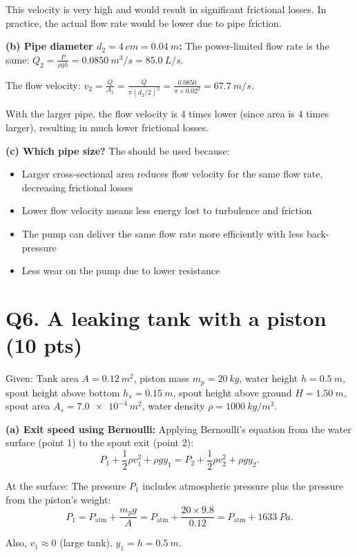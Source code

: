 \documentclass[11pt]{article}
\newcommand{\ans}[1]{\boxed{\displaystyle #1}}
\begin{document}
This velocity is very high and would result in significant frictional losses. In practice, the actual flow rate would be lower due to pipe friction.

\textbf{(b) Pipe diameter $d_2 = \SI{4}{cm} = \SI{0.04}{m}$:} The power-limited flow rate is the same: $Q_2 = \frac{P}{\rho g h} = \ans{\SI{0.0850}{m^3/s} = \SI{85.0}{L/s}}$.

The flow velocity: $v_2 = \frac{Q}{A_2} = \frac{Q}{\pi (d_2/2)^2} = \frac{0.0850}{\pi \times 0.02^2} = \SI{67.7}{m/s}$.

With the larger pipe, the flow velocity is 4 times lower (since area is 4 times larger), resulting in much lower frictional losses.

\textbf{(c) Which pipe size?} The \ans{4 cm pipe} should be used because:
\begin{itemize}
  \item Larger cross-sectional area reduces flow velocity for the same flow rate, decreasing frictional losses
  \item Lower flow velocity means less energy lost to turbulence and friction
  \item The pump can deliver the same flow rate more efficiently with less back-pressure
  \item Less wear on the pump due to lower resistance
\end{itemize}

\section*{Q6. A leaking tank with a piston (10 pts)}
Given: Tank area $A = \SI{0.12}{m^2}$, piston mass $m_p = \SI{20}{kg}$, water height $h = \SI{0.5}{m}$, spout height above bottom $h_s = \SI{0.15}{m}$, spout height above ground $H = \SI{1.50}{m}$, spout area $A_s = \SI{7.0e-4}{m^2}$, water density $\rho = \SI{1000}{kg/m^3}$.

\textbf{(a) Exit speed using Bernoulli:} Applying Bernoulli's equation from the water surface (point 1) to the spout exit (point 2):
\[ P_1 + \frac{1}{2}\rho v_1^2 + \rho g y_1 = P_2 + \frac{1}{2}\rho v_2^2 + \rho g y_2. \]

At the surface: The pressure $P_1$ includes atmospheric pressure plus the pressure from the piston's weight:
\[ P_1 = P_{\text{atm}} + \frac{m_p g}{A} = P_{\text{atm}} + \frac{20 \times 9.8}{0.12} = P_{\text{atm}} + \SI{1633}{Pa}. \]

Also, $v_1 \approx 0$ (large tank), $y_1 = h = \SI{0.5}{m}$.
\end{document}
